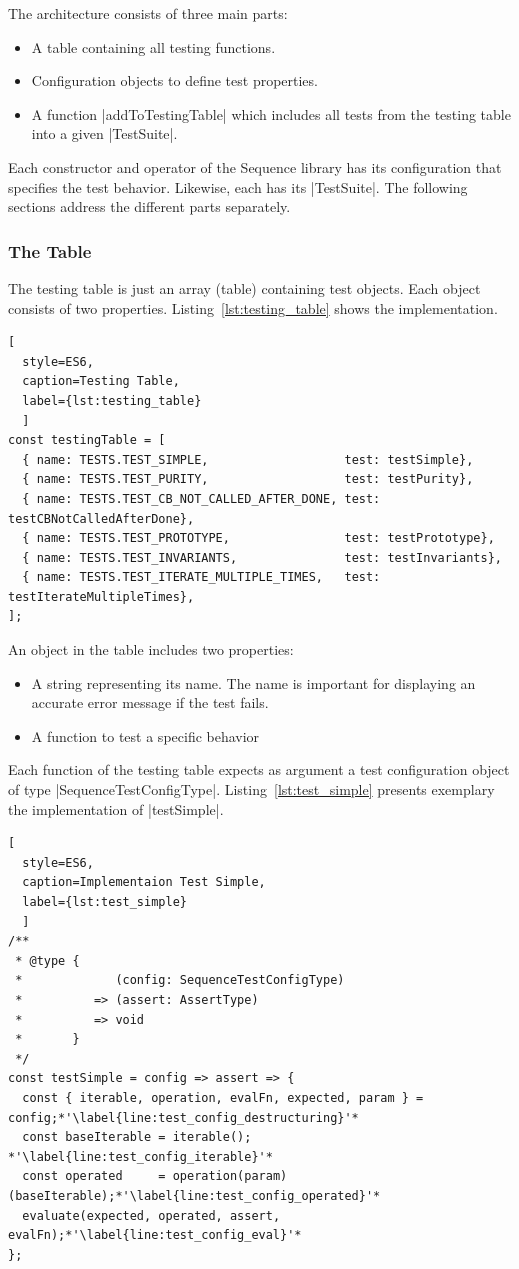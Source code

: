 The architecture consists of three main parts:
\begin{itemize}
  \item{A table containing all testing functions.}
  \item{Configuration objects to define test properties.}
  \item{A function |addToTestingTable| which includes all tests from the testing
    table into a given |TestSuite|.}
\end{itemize}

Each constructor and operator of the Sequence library has its configuration
that specifies the test behavior. Likewise, each has its |TestSuite|. 
The following sections address the different parts separately.

\subsubsection{The Table}
\label{subsub:The Table}
The testing table is just an array (table) containing test objects.
Each object consists of two properties. Listing~\ref{lst:testing_table} shows
the implementation.

\begin{lstlisting}[
  style=ES6, 
  caption=Testing Table,
  label={lst:testing_table}
  ]
const testingTable = [
  { name: TESTS.TEST_SIMPLE,                   test: testSimple},
  { name: TESTS.TEST_PURITY,                   test: testPurity},
  { name: TESTS.TEST_CB_NOT_CALLED_AFTER_DONE, test: testCBNotCalledAfterDone},
  { name: TESTS.TEST_PROTOTYPE,                test: testPrototype},
  { name: TESTS.TEST_INVARIANTS,               test: testInvariants},
  { name: TESTS.TEST_ITERATE_MULTIPLE_TIMES,   test: testIterateMultipleTimes},
];
\end{lstlisting}

An object in the table includes two properties:
\begin{itemize}
\item{A string representing its name. The name is important for displaying an accurate error message if the test fails.}
\item{A function to test a specific behavior}
\end{itemize}

Each function of the testing table expects as argument a test configuration
object of type |SequenceTestConfigType|.
Listing~\ref{lst:test_simple} presents exemplary the implementation of |testSimple|.

\begin{lstlisting}[
  style=ES6, 
  caption=Implementaion Test Simple,
  label={lst:test_simple}
  ]
/**
 * @type {
 *             (config: SequenceTestConfigType)
 *          => (assert: AssertType)
 *          => void
 *       }
 */
const testSimple = config => assert => {
  const { iterable, operation, evalFn, expected, param } = config;*'\label{line:test_config_destructuring}'*
  const baseIterable = iterable(); *'\label{line:test_config_iterable}'*
  const operated     = operation(param)(baseIterable);*'\label{line:test_config_operated}'*
  evaluate(expected, operated, assert, evalFn);*'\label{line:test_config_eval}'*
};
\end{lstlisting}

